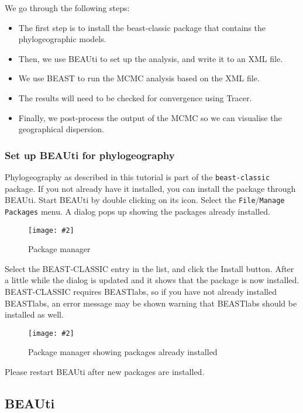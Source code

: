 \documentclass{article}
\newcommand{\includeimage}[2][]{%
\texttt{[image: \#2]}
}
\begin{document}
We go through the following steps:
\begin{itemize}
\item The first step is to install the beast-classic package that contains the phylogeographic models. 
\item Then, we use BEAUti to set up the analysis, and write it to an XML file.
\item We use BEAST to run the MCMC analysis based on the XML file.
\item The results will need to be checked for convergence using Tracer.
\item Finally, we post-process the output of the MCMC so we can visualise the geographical dispersion.
\end{itemize}

\subsubsection*{Set up BEAUti for phylogeography}

Phylogeography as described in this tutorial is part of the {\tt beast-classic} package.
If you not already have it installed, you can
install the package through BEAUti. Start BEAUti by double clicking on its icon. 
Select the \texttt{File}/\texttt{Manage Packages} menu. A dialog pops up showing the packages already installed. 

\begin{figure}
\centering	
\includeimage[scale=0.3]{figures/addonmgr}
\caption{Package manager}
\label{fig.datapartition} 
\end{figure}


Select the BEAST-CLASSIC entry in the list, and click the Install button. After a little while the dialog is updated and it shows that the package is now installed.
BEAST-CLASSIC requires BEASTlabs, so if you have not already installed BEASTlabs, an error message may be shown warning that BEASTlabs should be installed as well.

\begin{figure}
\centering	
\includeimage[scale=0.3]{figures/addonmgr2}
\caption{Package manager showing packages already installed}
\label{fig.datapartition} 
\end{figure}

Please restart BEAUti after new packages are installed. 


\subsection*{BEAUti}
\end{document}
